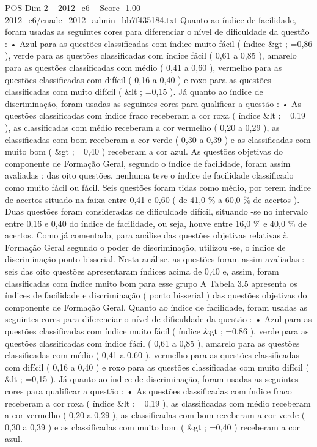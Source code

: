 \begin{textsample}{POS Dim 2 – 2012\_c6 – Score -1.00 – 2012\_c6/enade\_2012\_admin\_bb7f435184.txt}
Quanto ao índice de facilidade, foram usadas as seguintes cores para diferenciar o nível de dificuldade da questão : • Azul para as questões classificadas com índice muito fácil ( índice \&gt ; =0,86 ), verde para as questões classificadas com índice fácil ( 0,61 a 0,85 ), amarelo para as questões classificadas com médio ( 0,41 a 0,60 ), vermelho para as questões classificadas com difícil ( 0,16 a 0,40 ) e roxo para as questões classificadas com muito difícil ( \&lt ; =0,15 ).
Já quanto ao índice de discriminação, foram usadas as seguintes cores para qualificar a questão : • As questões classificadas com índice fraco receberam a cor roxa ( índice \&lt ; =0,19 ), as classificadas com médio receberam a cor vermelho ( 0,20 a 0,29 ), as classificadas com bom receberam a cor verde ( 0,30 a 0,39 ) e as classificadas com muito bom ( \&gt ; =0,40 ) receberam a cor azul.
As questões objetivas do componente de Formação Geral, segundo o índice de facilidade, foram assim avaliadas : das oito questões, nenhuma teve o índice de facilidade classificado como muito fácil ou fácil.
Seis questões foram tidas como médio, por terem índice de acertos situado na faixa entre 0,41 e 0,60 ( de 41,0 \% a 60,0 \% de acertos ).
Duas questões foram consideradas de dificuldade difícil, situando -se no intervalo entre 0,16 e 0,40 do índice de facilidade, ou seja, houve entre 16,0 \% e 40,0 \% de acertos.
Como já comentado, para análise das questões objetivas relativas à Formação Geral segundo o poder de discriminação, utilizou -se, o índice de discriminação ponto bisserial.
Nesta análise, as questões foram assim avaliadas : seis das oito questões apresentaram índices acima de 0,40 e, assim, foram classificadas com índice muito bom para esse grupo A Tabela 3.5 apresenta os índices de facilidade e discriminação ( ponto bisserial ) das questões objetivas do componente de Formação Geral.
Quanto ao índice de facilidade, foram usadas as seguintes cores para diferenciar o nível de dificuldade da questão : • Azul para as questões classificadas com índice muito fácil ( índice \&gt ; =0,86 ), verde para as questões classificadas com índice fácil ( 0,61 a 0,85 ), amarelo para as questões classificadas com médio ( 0,41 a 0,60 ), vermelho para as questões classificadas com difícil ( 0,16 a 0,40 ) e roxo para as questões classificadas com muito difícil ( \&lt ; =0,15 ).
Já quanto ao índice de discriminação, foram usadas as seguintes cores para qualificar a questão : • As questões classificadas com índice fraco receberam a cor roxa ( índice \&lt ; =0,19 ), as classificadas com médio receberam a cor vermelho ( 0,20 a 0,29 ), as classificadas com bom receberam a cor verde ( 0,30 a 0,39 ) e as classificadas com muito bom ( \&gt ; =0,40 ) receberam a cor azul.

\end{textsample}
